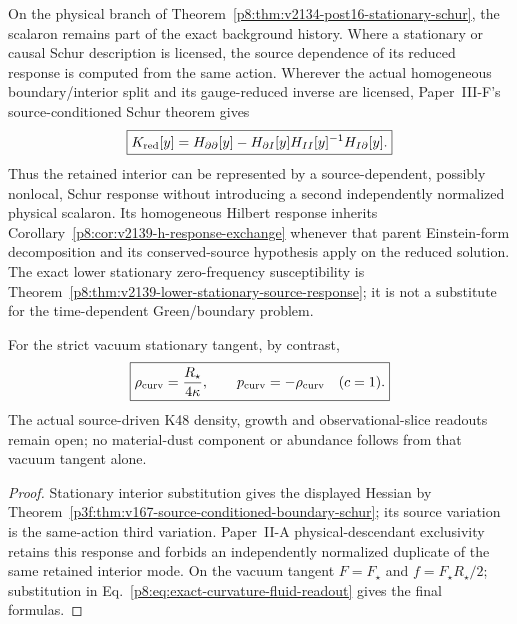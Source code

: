 \documentclass[12pt,a4paper]{article}
\begin{document}
\begin{corollary}
\label{p8:cor:v2139-post16-schur-h-response}
On the physical branch of
Theorem~\ref{p8:thm:v2134-post16-stationary-schur}, the scalaron remains part of
the exact background history.  Where a stationary or causal Schur description
is licensed, the source dependence of its reduced response is computed from the
same action.  Wherever the
actual homogeneous boundary/interior split and its gauge-reduced inverse are
licensed, Paper~III-F's source-conditioned Schur theorem gives
\[
 \boxed{K_{\rm red}[y]
 =H_{\partial\partial}[y]
 -H_{\partial I}[y]H_{II}[y]^{-1}H_{I\partial}[y].}
\]
Thus the retained interior can be represented by a source-dependent, possibly
nonlocal, Schur response without introducing a second independently normalized
physical scalaron.  Its homogeneous Hilbert response inherits
Corollary~\ref{p8:cor:v2139-h-response-exchange} whenever that parent
Einstein-form decomposition and its conserved-source hypothesis apply on the
reduced solution.  The exact lower stationary zero-frequency susceptibility
is Theorem~\ref{p8:thm:v2139-lower-stationary-source-response}; it is not a
substitute for the time-dependent Green/boundary problem.

For the strict vacuum stationary tangent, by contrast,
\[
 \boxed{\rho_{\rm curv}=\frac{R_\star}{4\kappa},\qquad
 p_{\rm curv}=-\rho_{\rm curv}\quad(c=1).}
\]
The actual source-driven K48 density, growth and observational-slice readouts
remain open; no material-dust component or abundance follows from that vacuum
tangent alone.
\end{corollary}
\begin{proof}
Stationary interior substitution gives the displayed Hessian by
Theorem~\ref{p3f:thm:v167-source-conditioned-boundary-schur}; its source
variation is the same-action third variation.  Paper~II-A physical-descendant exclusivity retains this response and forbids an
independently normalized duplicate of the same retained interior mode.  On the vacuum tangent
$F=F_\star$ and $f=F_\star R_\star/2$; substitution in
Eq.~\eqref{p8:eq:exact-curvature-fluid-readout} gives the final formulas.
\end{proof}
\end{document}
